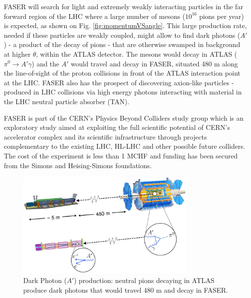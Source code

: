 FASER will search for light and extremely weakly interacting particles in the far forward region of the LHC where a large number of mesons ($10^{16}$ pions per year) is expected, as shown on Fig. \ref{fig:momentumVSangle}. This large production rate, needed if these particles are weakly coupled, might allow to find dark photons ($A'$) - a product of the decay of pions - that are otherwise swamped in background at higher $\theta$, within the ATLAS detector. The mesons would decay in ATLAS ($\pi^{0}\rightarrow A'\gamma$) and the $A'$ would travel and decay in FASER, situated 480 m along the line-of-sight of the proton collisions in front of the ATLAS interaction point at the LHC. FASER also has the prospect of discovering axion-like particles - produced in LHC collisions via high energy
photons interacting with material in the LHC neutral particle absorber
(TAN). 

FASER is part of the CERN's Physics Beyond Colliders study group which is an exploratory study aimed at exploiting the full scientific potential of CERN's accelerator complex and its scientific infrastructure through projects complementary to the existing LHC, HL-LHC and other possible future colliders. The cost of the
experiment is less than 1 MCHF and funding has been secured from the Simons and Heising-Simons foundations.

\begin{figure}[htbp!] 
\centering    
\includegraphics[width=0.8\textwidth]{Introduction/Figs/Raster/DarkPhotonProduction.jpg}
\caption[Dark Photon Production]{Dark Photon ($A'$) production: neutral pions decaying in ATLAS produce dark photons that would travel 480 m and decay in FASER.}
\label{fig:DarkPhotonProduction}
\end{figure}

